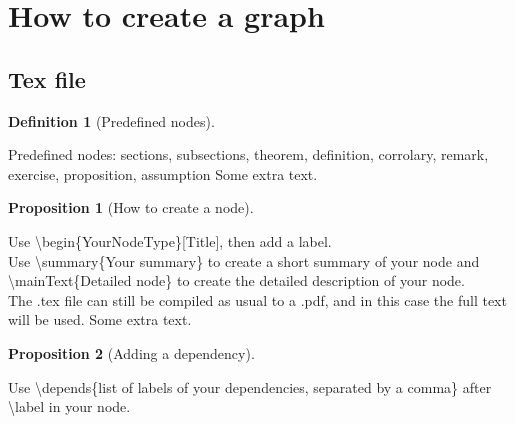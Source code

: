 \documentclass{article}
\theoremstyle{definition}
\newtheorem{definition}{Definition}
\newtheorem{proposition}{Proposition}
\newcommand{\depends}[1]{}
\newcommand{\summary}[1]{}
\newcommand{\mainText}[1]{#1}
\begin{document}
\section{How to create a graph}
\label{sec:Prob}%

\subsection{Tex file}
\label{subsec:tex}

\begin{definition}[Predefined nodes]%
    \label{def:predefined-nodes} %
    \summary{
        Predefined nodes: sections, subsections, theorem, definition, corrolary, remark, exercise, proposition, assumption
    }
    \mainText{
        Predefined nodes: sections, subsections, theorem, definition, corrolary, remark, exercise, proposition, assumption
        Some extra text.
    }
\end{definition}

\begin{proposition}[How to create a node]
    \label{prop:create-node}
    \depends{def:predefined-nodes}%
    \summary{
        Use \textbackslash begin\{YourNodeType\}[Title], then add a label. \\
        Use \textbackslash summary\{Your summary\} to create a short summary of your node and \textbackslash mainText\{Detailed node\} to create the detailed description of your node. \\
        The .tex file can still be compiled as usual to a .pdf, and in this case the full text will be used.
    }
    \mainText{
        Use \textbackslash begin\{YourNodeType\}[Title], then add a label. \\
        Use \textbackslash summary\{Your summary\} to create a short summary of your node and \textbackslash mainText\{Detailed node\} to create the detailed description of your node. \\
        The .tex file can still be compiled as usual to a .pdf, and in this case the full text will be used. 
        Some extra text.
    }
\end{proposition}

\begin{proposition}[Adding a dependency]
    \label{prop:add-dependency}
    \depends{prop:create-node}
    \summary{
        Use \textbackslash depends\{list of labels of your dependencies, separated by a comma\} after \textbackslash label in your node.
    }
    \mainText{
        Use \textbackslash depends\{list of labels of your dependencies, separated by a comma\} after \textbackslash label in your node.
    }
\end{proposition}
\end{document}
